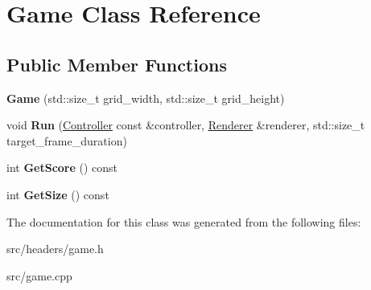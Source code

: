 \hypertarget{classGame}{}\section{Game Class Reference}
\label{classGame}
\subsection*{Public Member Functions}
\begin{DoxyCompactItemize}
\item 
{\bfseries Game} (std\+::size\+\_\+t grid\+\_\+width, std\+::size\+\_\+t grid\+\_\+height)\hypertarget{classGame_a9435144729147bed5dbc3496cf90f673}{}\label{classGame_a9435144729147bed5dbc3496cf90f673}

\item 
void {\bfseries Run} (\hyperlink{classController}{Controller} const \&controller, \hyperlink{classRenderer}{Renderer} \&renderer, std\+::size\+\_\+t target\+\_\+frame\+\_\+duration)\hypertarget{classGame_ab5b1c2bbb5dc3a543e0202c577c1d359}{}\label{classGame_ab5b1c2bbb5dc3a543e0202c577c1d359}

\item 
int {\bfseries Get\+Score} () const \hypertarget{classGame_a8c723589e2a4fce7e0e1dc87f2c850e3}{}\label{classGame_a8c723589e2a4fce7e0e1dc87f2c850e3}

\item 
int {\bfseries Get\+Size} () const \hypertarget{classGame_a3e6a9d95fdfca9c5ffb90dbc8e368703}{}\label{classGame_a3e6a9d95fdfca9c5ffb90dbc8e368703}

\end{DoxyCompactItemize}


The documentation for this class was generated from the following files\+:\begin{DoxyCompactItemize}
\item 
src/headers/game.\+h\item 
src/game.\+cpp\end{DoxyCompactItemize}

